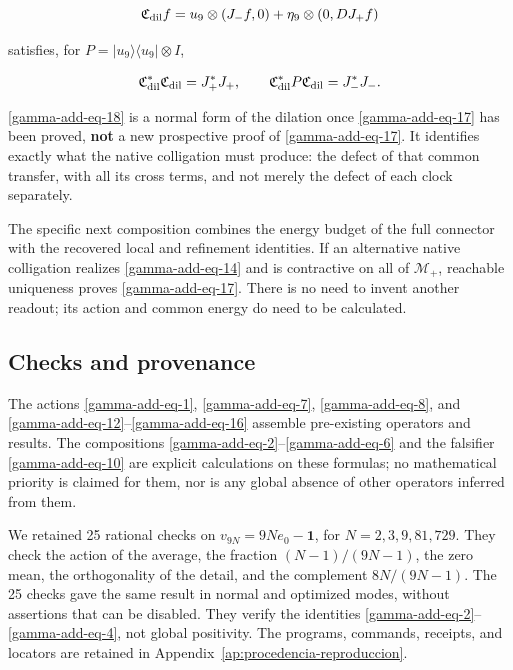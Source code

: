\begin{equation}
\mathfrak C_{\rm dil}f
=u_9\otimes(J_-f,0)+\eta_9\otimes(0,DJ_+f)
\label{gamma-add-eq-18}
\end{equation}

satisfies, for \(P=|u_9\rangle\langle u_9|\otimes I\),

\begin{equation}
\mathfrak C_{\rm dil}^*\mathfrak C_{\rm dil}=J_+^*J_+,\qquad
\mathfrak C_{\rm dil}^*P\mathfrak C_{\rm dil}=J_-^*J_-.
\label{gamma-add-display-37}
\end{equation}

\eqref{gamma-add-eq-18} is a normal form of the dilation once \eqref{gamma-add-eq-17} has been proved, \textbf{not} a new prospective proof of \eqref{gamma-add-eq-17}. It identifies exactly what the native colligation must produce: the defect of that common transfer, with all its cross terms, and not merely the defect of each clock separately.

The specific next composition combines the energy budget of the full connector with the recovered local and refinement identities. If an alternative native colligation realizes \eqref{gamma-add-eq-14} and is contractive on all of \(\mathcal M_+\), reachable uniqueness proves \eqref{gamma-add-eq-17}. There is no need to invent another readout; its action and common energy do need to be calculated.

\subsection{Checks and provenance}
\label{gamma-add-sub-412}

The actions \eqref{gamma-add-eq-1}, \eqref{gamma-add-eq-7},
\eqref{gamma-add-eq-8}, and \eqref{gamma-add-eq-12}--\eqref{gamma-add-eq-16}
assemble pre-existing operators and results. The compositions
\eqref{gamma-add-eq-2}--\eqref{gamma-add-eq-6} and the falsifier
\eqref{gamma-add-eq-10} are explicit calculations on these formulas;
no mathematical priority is claimed for them, nor is any
global absence of other operators inferred from them.

We retained 25 rational checks on
\(v_{9N}=9Ne_0-\mathbf1\), for \(N=2,3,9,81,729\).
They check the action of the average, the fraction \((N-1)/(9N-1)\),
the zero mean, the orthogonality of the detail, and the complement
\(8N/(9N-1)\). The 25 checks gave the same result in normal
and optimized modes, without assertions that can be disabled. They verify the identities
\eqref{gamma-add-eq-2}--\eqref{gamma-add-eq-4}, not global positivity.
The programs, commands, receipts, and locators are retained in
Appendix~\ref{ap:procedencia-reproduccion}.

